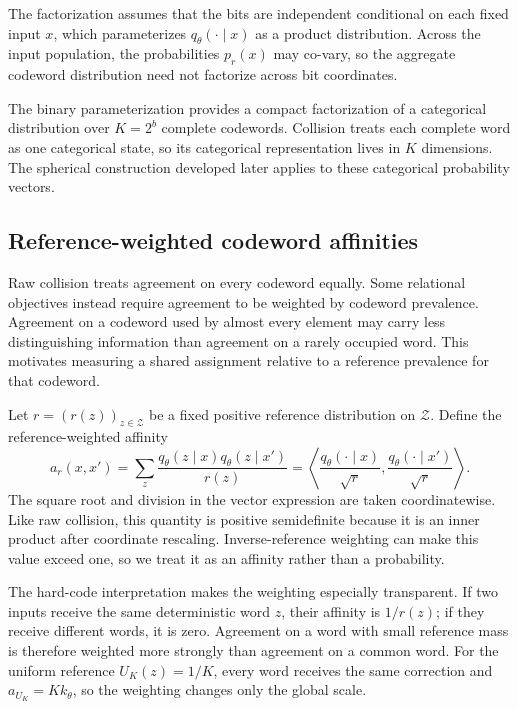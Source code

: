 The factorization assumes that the bits are independent conditional on each fixed input $x$, which parameterizes $q_\theta(\cdot\mid x)$ as a product distribution.
Across the input population, the probabilities $p_r(x)$ may co-vary, so the aggregate codeword distribution need not factorize across bit coordinates.

The binary parameterization provides a compact factorization of a categorical distribution over $K=2^b$ complete codewords.
Collision treats each complete word as one categorical state, so its categorical representation lives in $K$ dimensions.
The spherical construction developed later applies to these categorical probability vectors.


\subsection{Reference-weighted codeword affinities}

Raw collision treats agreement on every codeword equally.
Some relational objectives instead require agreement to be weighted by codeword prevalence.
Agreement on a codeword used by almost every element may carry less distinguishing information than agreement on a rarely occupied word.
This motivates measuring a shared assignment relative to a reference prevalence for that codeword.

Let $r=(r(z))_{z\in\mathcal Z}$ be a fixed positive reference distribution on $\mathcal Z$.
Define the reference-weighted affinity
\begin{equation}
a_r(x,x')
=\sum_z\frac{q_\theta(z\mid x)q_\theta(z\mid x')}{r(z)}
=\left\langle\frac{q_\theta(\cdot\mid x)}{\sqrt r},
\frac{q_\theta(\cdot\mid x')}{\sqrt r}\right\rangle.
\label{eq:reference-affinity}
\end{equation}
The square root and division in the vector expression are taken coordinatewise.
Like raw collision, this quantity is positive semidefinite because it is an inner product after coordinate rescaling.
Inverse-reference weighting can make this value exceed one, so we treat it as an affinity rather than a probability.

The hard-code interpretation makes the weighting especially transparent.
If two inputs receive the same deterministic word $z$, their affinity is $1/r(z)$; if they receive different words, it is zero.
Agreement on a word with small reference mass is therefore weighted more strongly than agreement on a common word.
For the uniform reference $U_K(z)=1/K$, every word receives the same correction and
$a_{U_K}=Kk_\theta$, so the weighting changes only the global scale.

